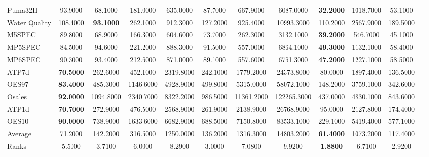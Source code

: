 \documentclass[12pt]{article}
\begin{document}
\begin{table*}[t!]
{\begin{threeparttable}
{{\begin{tabular}{lccccccccccc}
Puma32H &93.9000 &68.1000 &181.0000 &635.0000 &87.7000 &667.9000 &6087.0000 &\textbf{32.2000} &1018.7000 &53.1000 &  \\
Water Quality &108.4000 &\textbf{93.1000} &262.1000 &912.3000 &127.2000 &925.4000 &10993.3000 &110.2000 &2567.9000 &189.5000 &  \\
M5SPEC &89.8000 &68.9000 &166.3000 &604.6000 &73.7000 &262.3000 &3132.1000 &\textbf{39.2000} &546.7000 &45.1000 &  \\
MP5SPEC &84.5000 &94.6000 &221.2000 &888.3000 &91.5000 &557.0000 &6864.1000 &\textbf{49.3000} &1132.1000 &58.4000 &  \\
MP6SPEC &90.3000 &93.4000 &212.6000 &871.0000 &89.1000 &557.6000 &6761.3000 &\textbf{47.2000} &1227.1000 &58.5000 &  \\
ATP7d &\textbf{70.5000} &262.6000 &452.1000 &2319.8000 &242.1000 &1779.2000 &24373.8000 &80.0000 &1897.4000 &136.5000 &  \\
OES97 &\textbf{83.4000} &485.3000 &1146.6000 &4928.9000 &499.8000 &5315.0000 &58072.1000 &148.2000 &3759.1000 &342.6000 &  \\
Osales &\textbf{92.0000} &1094.8000 &2340.7000 &8322.2000 &986.5000 &11361.2000 &122265.3000 &437.0000 &4830.1000 &843.6000 &  \\
ATP1d &\textbf{70.7000} &272.9000 &476.5000 &2568.9000 &261.9000 &2138.9000 &26768.9000 &95.0000 &2127.8000 &174.4000 &  \\
OES10 &\textbf{90.0000} &738.9000 &1633.6000 &6682.9000 &688.5000 &7150.8000 &83533.1000 &229.1000 &5419.4000 &577.1000 &  \\
\hline
Average &71.2000 &142.2000 &316.5000 &1250.0000 &136.2000 &1316.3000 &14803.2000 &\textbf{61.4000} &1073.2000 &117.4000 &  \\
Ranks &5.5000 &3.7100 &6.0000 &8.2900 &3.0000 &7.0800 &9.9200 &\textbf{1.8800} &6.7100 &2.9200 &  \\
\bottomrule
\end{tabular}}}
\end{threeparttable}}
\label{tab:timeresults}
\bigskip
\end{table*}
\end{document}
